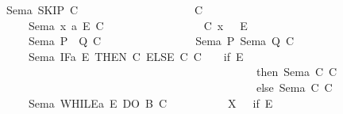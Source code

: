 \begin{isabellebody}
\ \ \ {\isacartoucheopen}Sem\isactrlsub a\ SKIP\ C\ \ \ \ \ \ \ \ \ \ \ \ \ \ \ \ \ \ \ \ {\isacharequal}{\kern0pt}\ C{\isacartoucheclose}\ \isanewline
\ \ \ \ \ \ \ {\isacharbar}{\kern0pt}{\isacartoucheopen}Sem\isactrlsub a\ {\isacharparenleft}{\kern0pt}x\ {\isacharcolon}{\kern0pt}{\isacharequal}{\kern0pt}\isactrlsub a\ E{\isacharparenright}{\kern0pt}\ C\ \ \ \ \ \ \ \ \ \ \ \ \ \ \ {\isacharequal}{\kern0pt}\ {\isacharparenleft}{\kern0pt}{\isasymlambda}\ {\isasymsigma}{\isachardot}{\kern0pt}\ C\ {\isacharparenleft}{\kern0pt}{\isasymsigma}{\isacharparenleft}{\kern0pt}{\isacharparenleft}{\kern0pt}x\ {\isasymsigma}{\isacharparenright}{\kern0pt}\ {\isacharcolon}{\kern0pt}{\isacharequal}{\kern0pt}\ E\ {\isasymsigma}{\isacharparenright}{\kern0pt}{\isacharparenright}{\kern0pt}{\isacharparenright}{\kern0pt}{\isacartoucheclose}\isanewline
\ \ \ \ \ \ \ {\isacharbar}{\kern0pt}{\isacartoucheopen}Sem\isactrlsub a\ {\isacharparenleft}{\kern0pt}P\ {\isacharsemicolon}{\kern0pt}{\isacharsemicolon}{\kern0pt}\ Q{\isacharparenright}{\kern0pt}\ C\ \ \ \ \ \ \ \ \ \ \ \ \ \ \ \ {\isacharequal}{\kern0pt}\ {\isacharparenleft}{\kern0pt}Sem\isactrlsub a\ P\ {\isacharparenleft}{\kern0pt}Sem\isactrlsub a\ Q\ C{\isacharparenright}{\kern0pt}{\isacharparenright}{\kern0pt}{\isacartoucheclose}\ \isanewline
\ \ \ \ \ \ \ {\isacharbar}{\kern0pt}{\isacartoucheopen}Sem\isactrlsub a\ {\isacharparenleft}{\kern0pt}IF\isactrlsub a\ E\ THEN\ C{}\ ELSE\ C{}{\isacharparenright}{\kern0pt}\ C\ {\isacharequal}{\kern0pt}\ {\isacharparenleft}{\kern0pt}{\isasymlambda}\ {\isasymsigma}{\isachardot}{\kern0pt}\ if\ E\ {\isasymsigma}\ \isanewline
\ \ \ \ \ \ \ \ \ \ \ \ \ \ \ \ \ \ \ \ \ \ \ \ \ \ \ \ \ \ \ \ \ \ \ \ \ \ \ \ \ \ \ \ \ \ \ \ then\ Sem\isactrlsub a\ C{}\ C\ {\isasymsigma}\ \isanewline
\ \ \ \ \ \ \ \ \ \ \ \ \ \ \ \ \ \ \ \ \ \ \ \ \ \ \ \ \ \ \ \ \ \ \ \ \ \ \ \ \ \ \ \ \ \ \ \ else\ Sem\isactrlsub a\ C{}\ C\ {\isasymsigma}{\isacharparenright}{\kern0pt}{\isacartoucheclose}\isanewline
\ \ \ \ \ \ \ {\isacharbar}{\kern0pt}{\isacartoucheopen}Sem\isactrlsub a\ {\isacharparenleft}{\kern0pt}WHILE\isactrlsub a\ E\ DO\ B{\isacharparenright}{\kern0pt}\ C\ \ \ \ \ \ \ \ \ {\isacharequal}{\kern0pt}\ {\isacharparenleft}{\kern0pt}{\isasymmu}\ X{\isachardot}{\kern0pt}\ {\isacharparenleft}{\kern0pt}{\isasymlambda}\ {\isasymsigma}{\isachardot}{\kern0pt}\ if\ E\ {\isasymsigma}\ \isanewline

\end{isabellebody}
